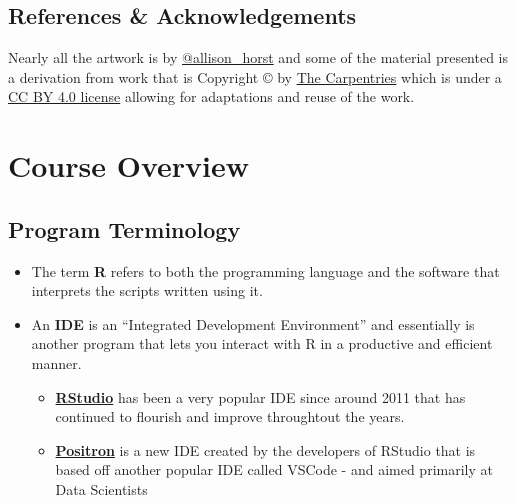 \documentclass[
  letterpaper,
  DIV=11,
  numbers=noendperiod,
  oneside]{scrreprt}
\providecommand{\tightlist}{%
  \setlength{\itemsep}{0pt}\setlength{\parskip}{0pt}}\usepackage{longtable,booktabs,array}
\begin{document}
\section*{References \&
Acknowledgements}\label{references-acknowledgements}


Nearly all the artwork is by
\href{https://allisonhorst.com/}{@allison\_horst} and some of the
material presented is a derivation from work that is Copyright © by
\href{https://carpentries.org/}{The Carpentries} which is under a
\href{https://creativecommons.org/licenses/by/4.0/}{CC BY 4.0 license}
allowing for adaptations and reuse of the work.


\chapter*{Course Overview}\label{course-overview}


\section*{Program Terminology}\label{program-terminology}


\begin{itemize}
\tightlist
\item
  The term \textbf{R} refers to both the programming language and the
  software that interprets the scripts written using it.
\item
  An \textbf{IDE} is an ``Integrated Development Environment'' and
  essentially is another program that lets you interact with R in a
  productive and efficient manner.

  \begin{itemize}
  \tightlist
  \item
    \textbf{\href{https://posit.co/downloads/}{RStudio}} has been a very
    popular IDE since around 2011 that has continued to flourish and
    improve throughtout the years.
  \item
    \textbf{\href{https://positron.posit.co/}{Positron}} is a new IDE
    created by the developers of RStudio that is based off another
    popular IDE called VSCode - and aimed primarily at Data Scientists
  \end{itemize}
\end{itemize}
\end{document}
